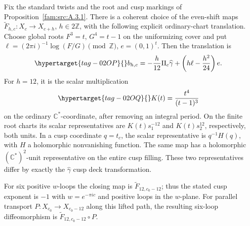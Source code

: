\begin{proposition}\hypertarget{tag-0322}{}\label{push:src:C.3.5}

Fix the standard twists and the root and cusp markings of Proposition~\ref{fam:src:A.3.1}.
There is a coherent choice of the even-shift maps
\(\widetilde F_{h,c}:X_c\to X_{c+h}\), \(h\in2\mathbb Z\),
with the following explicit ordinary-chart translation. Choose global
roots \(F^3=t\), \(G^4=t-1\) on the uniformizing cover and put
\(\ell=(2\pi i)^{-1}\log(F/G)\pmod{\mathbb Z}\), \(e=(0,1)^t\).
Then the translation is
\begin{equation}\hypertarget{tag-02OP}{}\label{mapsI:closing:eq:C-explicit-closing}
 b_{h,c}=-\frac h{12}\Pi_c\widehat\gamma
              +\left(h\ell-\frac{h^2}{24}\right)e.
\end{equation}
For \(h=12\), it is the scalar multiplication
\begin{equation}\hypertarget{tag-02OQ}{}\label{mapsI:closing:eq:C-twelve-scalar}
 K(t)=\frac{t^4}{(t-1)^3}
\end{equation}
on the ordinary \(\mathbb C^*\)-coordinate, after removing an integral
period. On the finite root charts its scalar representatives are
\(K(t)s_1^{-12}\) and \(K(t)s_2^{12}\), respectively, both units.
In a cusp coordinate \(q=t_c\), the scalar representative is
\(q^{-1}H(q)\), with \(H\) a holomorphic nonvanishing function.
The same map has a holomorphic \((\mathbb C^*)^2\)-unit representative
on the entire cusp filling. These two representatives differ by
exactly the \(\widehat\gamma\) cusp deck transformation.

For six positive \(w\)-loops the closing map is
\(\widetilde F_{12,c_0-12}\); thus the stated cusp exponent is \(-1\)
with $w=e^{-\pi i c}$ and positive loops in the $w$-plane. For parallel transport $P:X_{c_0}\to X_{c_0-12}$ along this lifted path, the resulting six-loop diffeomorphism is $\widetilde F_{12,c_0-12}\circ P$.
\end{proposition}

